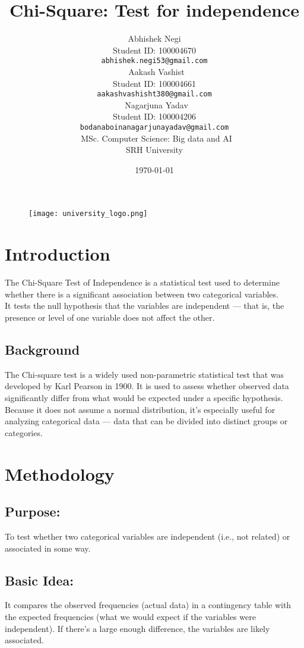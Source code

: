 \documentclass[12pt]{article}
\title{Chi-Square: Test for independence}
\author{
    Abhishek Negi \\ 
    Student ID: 100004670 \\ 
    \texttt{abhishek.negi53@gmail.com}\\[6pt]
    \,
    Aakash Vashist \\ 
    Student ID: 100004661 \\ 
    \texttt{aakashvashisht380@gmail.com}\\[6pt]
    \,
    Nagarjuna Yadav \\ 
    Student ID: 100004206 \\ 
    \texttt{bodanaboinanagarjunayadav@gmail.com}\\[6pt]
    \,
    MSc. Computer Science: Big data and AI\\
    SRH University
}
\date{\today}
\begin{document}
\begin{figure}[H]
\flushright
\texttt{[image: university\_logo.png]} 
\end{figure}

\maketitle  %

\newpage

\tableofcontents  %
\newpage

\section{Introduction}
The Chi-Square Test of Independence is a statistical test used to determine whether there is a significant association between two categorical variables.\\[4pt]
It tests the null hypothesis that the variables are independent — that is, the presence or level of one variable does not affect the other.

\subsection{Background}
The Chi-square test is a widely used non-parametric statistical test that was developed by Karl Pearson in 1900. It is used to assess whether observed data significantly differ from what would be expected under a specific hypothesis. Because it does not assume a normal distribution, it's especially useful for analyzing categorical data — data that can be divided into distinct groups or categories.

\section{Methodology}

\subsection{Purpose:}
To test whether two categorical variables are independent (i.e., not related) or associated in some way.

\subsection{Basic Idea:}
It compares the observed frequencies (actual data) in a contingency table with the expected frequencies (what we would expect if the variables were independent). If there's a large enough difference, the variables are likely associated.
\end{document}
